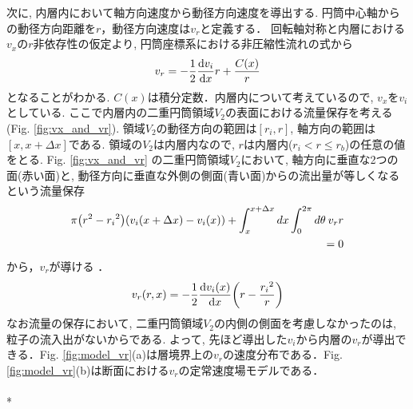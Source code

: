 \documentclass[prl,twocolumn,superscriptaddress]{revtex4}
\begin{document}
次に, 内層内において軸方向速度から動径方向速度を導出する. 円筒中心軸からの動径方向距離を$r$，動径方向速度は$v_r$と定義する．
回転軸対称と内層における$v_x$の$r$非依存性の仮定より, 円筒座標系における非圧縮性流れの式から \\
\begin{eqnarray*}
v_r = -\dfrac{1}{2}\dv{v_i}{x}r+\dfrac{C(x)}{r}
\end{eqnarray*}
となることがわかる. $C(x)$は積分定数．内層内について考えているので, $v_x$を$v_i$としている. ここで内層内の二重円筒領域$V_2$の表面における流量保存を考える(Fig. \ref{fig:vx_and_vr}). 領域$V_2$の動径方向の範囲は$[r_i, r]$, 軸方向の範囲は$[x, x+\Delta x]$である. 領域の$V_2$は内層内なので, $r$は内層内($r_i < r\leqslant r_b$)の任意の値をとる. Fig. \ref{fig:vx_and_vr} の二重円筒領域$V_2$において, 軸方向に垂直な2つの面(赤い面)と, 動径方向に垂直な外側の側面(青い面)からの流出量が等しくなるという流量保存 \\
\begin{eqnarray*}
\pi\qty(r^2-{r_i}^2)\qty(v_i(x+\Delta x)-v_i(x)) + \displaystyle\int_{x}^{x+\Delta x}dx\int_{0}^{2\pi}d\theta\hspace{2pt}v_rr \\
= 0 \\
\end{eqnarray*}
から，$v_r$が導ける \cite{supplement}．
\begin{eqnarray} \label{eq:vx_vr}
v_r(r,x) = -\dfrac{1}{2}\dv{v_i(x)}{x}\qty(r-\dfrac{{r_i}^2}{r})
\end{eqnarray}
なお流量の保存において, 二重円筒領域$V_2$の内側の側面を考慮しなかったのは, 粒子の流入出がないからである. よって, 先ほど導出した$v_i$から内層の$v_r$が導出できる．Fig. \ref{fig:model_vr}(a)は層境界上の$v_r$の速度分布である．Fig. \ref{fig:model_vr}(b)は断面における$v_r$の定常速度場モデルである．\\
\\*
\end{document}
